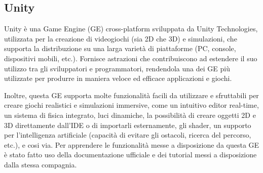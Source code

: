\subsection{Unity} \label{unity}

Unity è una Game Engine (GE) cross-platform sviluppata da Unity Technologies, utilizzata per la creazione di videogiochi (sia 2D che 3D) e simulazioni, che supporta la distribuzione su una larga varietà di piattaforme (PC, console, dispositivi mobili, etc.). Fornisce astrazioni che contribuiscono ad estendere il suo utilizzo tra gli sviluppatori e programmatori, rendendola una dei GE più utilizzate per produrre in maniera veloce ed efficace applicazioni e giochi.\cite{unity}

\medskip

Inoltre, questa GE supporta molte funzionalità facili da utilizzare e sfruttabili per creare giochi realistici e simulazioni immersive, come un intuitivo editor real-time, un sistema di fisica integrato, luci dinamiche, la possibilità di creare oggetti 2D e 3D direttamente dall'IDE o di importarli esternamente, gli shader, un supporto per l'intelligenza artificiale (capacità di evitare gli ostacoli, ricerca del percorso, etc.), e cosi via. Per apprendere le funzionalità messe a disposizione da questa GE è stato fatto uso della documentazione ufficiale \cite{unity-documentation} e dei tutorial \cite{unity-learn} messi a disposizione dalla stessa compagnia.

\medskip

